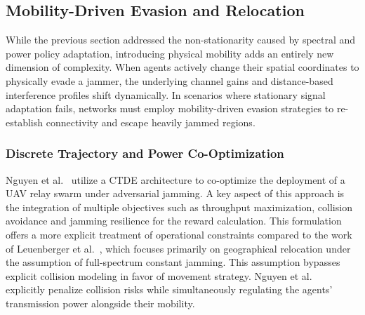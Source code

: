 \documentclass[conference]{IEEEtran}
\newcommand{\adm}[1]{{\color{orange}{[#1]}}}
\begin{document}
\subsection{Mobility-Driven Evasion and Relocation}
While the previous section addressed the non-stationarity caused by spectral and power policy adaptation, introducing physical mobility adds an entirely new dimension of complexity.
When agents actively change their spatial coordinates to physically evade a jammer, the underlying channel gains and distance-based interference profiles shift dynamically.
In scenarios where stationary signal adaptation fails, networks must employ mobility-driven evasion strategies to re-establish connectivity and escape heavily jammed regions.
\adm{can look at https://ieeexplore.ieee.org/abstract/document/11302544/. it is related because it's cooperative marl for countering jamming, but it's not that related because they're not looking into PHY regulation from either attacker or defenders. the final length of RW section should be around 1 or 1.5 columns (plus a RW table) so we should select those works that are closely relevant to what you propose. This one https://ieeexplore.ieee.org/document/10547296 tries to consider both aspects: what are limitations that can be fixed? In both scenarios it is assumes that mobile nodes's trajectories can be controlled, but it is often not the case (e.g., network of smartphones)}

\subsubsection{Discrete Trajectory and Power Co-Optimization}
Nguyen et al.~ utilize a CTDE architecture to co-optimize the deployment of a UAV relay swarm under adversarial jamming.
A key aspect of this approach is the integration of multiple objectives such as throughput maximization, collision avoidance and jamming resilience for the reward calculation.
This formulation offers a more explicit treatment of operational constraints compared to the work of Leuenberger et al.~, which focuses primarily on geographical relocation under the assumption of full-spectrum constant jamming.
This assumption bypasses explicit collision modeling in favor of movement strategy.
Nguyen et al.~ explicitly penalize collision risks while simultaneously regulating the agents' transmission power alongside their mobility.
\end{document}
